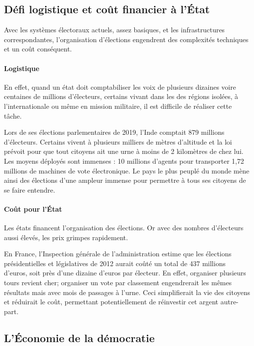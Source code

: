 \documentclass[11pt,a4paper]{report}
\begin{document}
\subsection{Défi logistique et coût financier à l'État}
Avec les systèmes électoraux actuels, assez basiques, et les infrastructures correspondantes, l'organisation d'élections engendrent des complexités techniques et un coût conséquent.

\paragraph{Logistique}
En effet, quand un état doit comptabiliser les voix de plusieurs dizaines voire centaines de millions d'électeurs, certains vivant dans les des régions isolées, à l'internationale ou même en mission militaire, il est difficile de réaliser cette tâche.

Lors de ses élections parlementaires de 2019, l'Inde comptait 879 millions d’électeurs.
Certains vivent à plusieurs milliers de mètres d'altitude et la loi prévoit pour que tout citoyens ait une urne à moins de 2 kilomètres de chez lui.
Les moyens déployés sont immenses : 10 millions d'agents pour transporter 1,72 millions de machines de vote électronique.
Le pays le plus peuplé du monde mène ainsi des élections d'une ampleur immense pour permettre à tous ses citoyens de se faire entendre.\nocite{lemonde:inde}

\paragraph{Coût pour l'État}
Les états financent l'organisation des élections. Or avec des nombres d'électeurs aussi élevés, les prix grimpes rapidement.

En France, l'Inspection générale de l'administration estime que les élections présidentielles et législatives de 2012 aurait coûté un total de 437 millions d'euros, soit près d'une dizaine d'euros par électeur.\nocite{senat:prixelec2012}
En effet, organiser plusieurs tours revient cher; organiser un vote par classement engendrerait les mêmes résultats mais avec mois de passages à l'urne.
Ceci simplifierait la vie des citoyens et réduirait le coût, permettant potentiellement de réinvestir cet argent autre-part.

\subsection{L'Économie de la démocratie}
\end{document}
